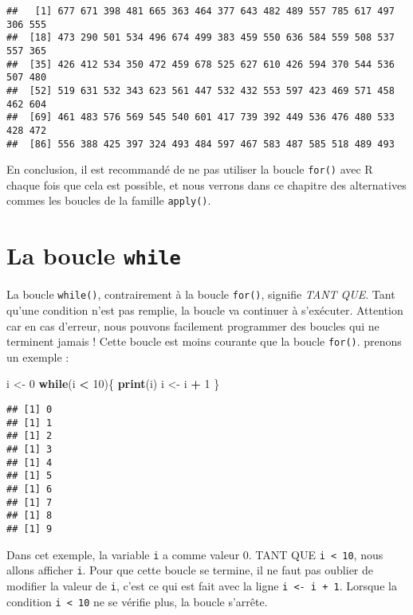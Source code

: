\documentclass[]{book}
\newenvironment{Shaded}{\begin{snugshade}}{\end{snugshade}}
\newcommand{\KeywordTok}[1]{\textcolor[rgb]{0.13,0.29,0.53}{\textbf{#1}}}
\newcommand{\DecValTok}[1]{\textcolor[rgb]{0.00,0.00,0.81}{#1}}
\newcommand{\StringTok}[1]{\textcolor[rgb]{0.31,0.60,0.02}{#1}}
\newcommand{\ControlFlowTok}[1]{\textcolor[rgb]{0.13,0.29,0.53}{\textbf{#1}}}
\newcommand{\OperatorTok}[1]{\textcolor[rgb]{0.81,0.36,0.00}{\textbf{#1}}}
\newcommand{\NormalTok}[1]{#1}
\theoremstyle{definition}
\theoremstyle{definition}
\theoremstyle{definition}
\theoremstyle{remark}
\begin{document}
\begin{verbatim}
##   [1] 677 671 398 481 665 363 464 377 643 482 489 557 785 617 497 306 555
##  [18] 473 290 501 534 496 674 499 383 459 550 636 584 559 508 537 557 365
##  [35] 426 412 534 350 472 459 678 525 627 610 426 594 370 544 536 507 480
##  [52] 519 631 532 343 623 561 447 532 432 553 597 423 469 571 458 462 604
##  [69] 461 483 576 569 545 540 601 417 739 392 449 536 476 480 533 428 472
##  [86] 556 388 425 397 324 493 484 597 467 583 487 585 518 489 493
\end{verbatim}

En conclusion, il est recommandé de ne pas utiliser la boucle
\texttt{for()} avec R chaque fois que cela est possible, et nous verrons
dans ce chapitre des alternatives commes les boucles de la famille
\texttt{apply()}.

\hypertarget{l17while}{\section{\texorpdfstring{La boucle
\texttt{while}}{La boucle while}}\label{l17while}}

La boucle \texttt{while()}, contrairement à la boucle \texttt{for()},
signifie \emph{TANT QUE}. Tant qu'une condition n'est pas remplie, la
boucle va continuer à s'exécuter. Attention car en cas d'erreur, nous
pouvons facilement programmer des boucles qui ne terminent jamais !
Cette boucle est moins courante que la boucle \texttt{for()}. prenons un
exemple :

\begin{Shaded}
\begin{Highlighting}[]
\NormalTok{i <-}\StringTok{ }\DecValTok{0}
\ControlFlowTok{while}\NormalTok{(i }\OperatorTok{<}\StringTok{ }\DecValTok{10}\NormalTok{)\{}
  \KeywordTok{print}\NormalTok{(i)}
\NormalTok{  i <-}\StringTok{ }\NormalTok{i }\OperatorTok{+}\StringTok{ }\DecValTok{1}
\NormalTok{\}}
\end{Highlighting}
\end{Shaded}

\begin{verbatim}
## [1] 0
## [1] 1
## [1] 2
## [1] 3
## [1] 4
## [1] 5
## [1] 6
## [1] 7
## [1] 8
## [1] 9
\end{verbatim}

Dans cet exemple, la variable \texttt{i} a comme valeur 0. TANT QUE
\texttt{i\ \textless{}\ 10}, nous allons afficher \texttt{i}. Pour que
cette boucle se termine, il ne faut pas oublier de modifier la valeur de
\texttt{i}, c'est ce qui est fait avec la ligne
\texttt{i\ \textless{}-\ i\ +\ 1}. Lorsque la condition
\texttt{i\ \textless{}\ 10} ne se vérifie plus, la boucle s'arrête.
\end{document}
